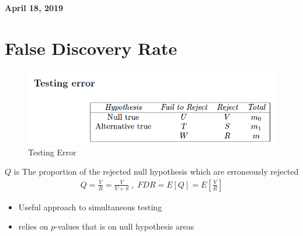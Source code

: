\documentclass[11pt]{article}
\begin{document}
%

\newcommand{\Ito}{$It\hat{o}$'$s~Lemma$}

\newcommand\ind{\stackrel{\rm ind}{\sim}}
\newcommand\iid{\stackrel{\rm iid}{\sim}}
\renewcommand\c{\mathbf{c}}
\newcommand\y{\mathbf{y}}
\newcommand\z{\mathbf{z}}
\renewcommand\P{\mathbf{P}}
\newcommand\W{\mathbf{W}}
\newcommand\X{\mathbf{X}}
\newcommand\Y{\mathbf{Y}}
\newcommand\Z{\mathbf{Z}}
\newcommand\J{{\cal J}}
\newcommand\B{{\cal B}}
\newcommand\K{{\cal K}}
\newcommand\N{{\rm N}}
\newcommand\bs{\boldsymbol}
\newcommand\bth{\bs\theta}
\newcommand\bbe{\bs\beta}
\renewcommand\*{^\star}

\def\spacingset#1{\renewcommand{\baselinestretch}%
{#1}\small\normalsize} \spacingset{1}



  \bigskip
  \bigskip
  \bigskip
  \begin{center}
    {\LARGE\bf April 18, 2019 }
  \end{center}
  \medskip



\spacingset{1.45}


\section{False Discovery Rate}
\begin{figure}[h]
	\centering
	\includegraphics[width=0.7\linewidth]{fdr}
	\caption{Testing Error}
	\label{fig:fdr}
\end{figure}
$Q$ is The proportion of the rejected null hypothesis which are erroneously rejected
\begin{align*}
Q = \frac{V}{R} = \frac{V}{V+S} \;, \; FDR = E[Q] = E[\frac{V}{R}]
\end{align*}
\begin{itemize}
	\item Useful approach to simultaneous testing
	\item relies on $p$-values that is on null hypothesis areas
\end{itemize}
\end{document}
